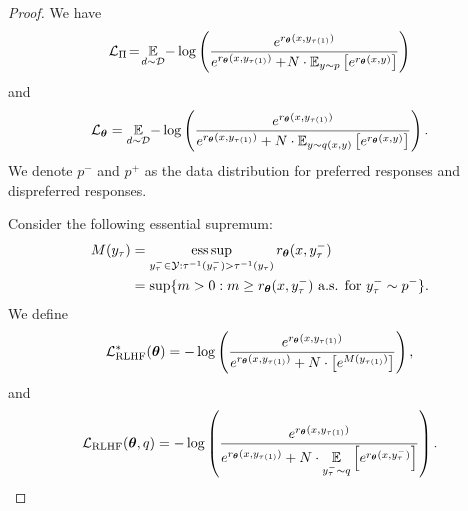 \begin{proof}
We have 
\[
\mathcal{L}_{\Pi} \!=\! \operatorname*{\mathbb{E}}_{d\sim\mathcal{D}}   \!
			-\log\left(\frac{e^{{ r_{{\boldsymbol{\theta}}}(x,y_{\tau\left( 1\right)})}}}{e^{{ r_{{\boldsymbol{\theta}}}(x,y_{\tau\left( 1\right)})}}+\! N\cdot\operatorname*{\mathbb{E}}\nolimits_{y \sim p}\left[e^{{r_{{\boldsymbol{\theta}}}(x,y)}}\right]}\right) \]
and
\[
\mathcal{L}_{{\boldsymbol{\theta}}}= \operatorname*{\mathbb{E}}_{d\sim\mathcal{D}}   \!
-\log\left(\frac{e^{{ r_{{\boldsymbol{\theta}}}(x,y_{\tau\left( 1\right)})}}}{e^{{ r_{{\boldsymbol{\theta}}}(x,y_{\tau\left( 1\right)})}}+ N\cdot\operatorname*{\mathbb{E}}\nolimits_{y \sim q(x,y)}\left[e^{{r_{{\boldsymbol{\theta}}}(x,y)}}\right]}\right).
\]
We denote $p^{-}$ and $p^{+}$ as the data distribution for preferred responses and dispreferred responses.

Consider the following essential supremum:
\begin{equation*}
\begin{aligned}
M(y_{\tau})&=\operatorname*{ess\,sup}\limits_{y^{-}_{\tau}\in\mathcal{Y}:\tau^{-1}(y^{-}_{\tau})>\tau^{-1}(y_{\tau})}{r_{{\boldsymbol{\theta}}}(x,y^{-}_{\tau})}\\
&=\sup\{m>0:m\geq r_{{\boldsymbol{\theta}}}(x,y^{-}_{\tau})\text{ a.s. for } y^{-}_{\tau} \sim p^{-}\}.
\end{aligned}
\end{equation*}
We define
\begin{equation*}
\mathcal{L}_{\text{RLHF}}^{*}({\boldsymbol{\theta}})=-\log\left(\frac{e^{{ r_{{\boldsymbol{\theta}}}(x,y_{\tau\left( 1\right)})}}}{e^{{ r_{{\boldsymbol{\theta}}}(x,y_{\tau\left( 1\right)})}}+N\cdot \left[e^{M(y_{\tau\left(1\right)})}\right]}\right),
\end{equation*}
and
\begin{equation*}
\mathcal{L}_{\text{RLHF}}({\boldsymbol{\theta}},q)=-\log\left(\frac{e^{{ r_{{\boldsymbol{\theta}}}(x,y_{\tau\left( 1\right)})}}}{e^{{ r_{{\boldsymbol{\theta}}}(x,y_{\tau\left( 1\right)})}}+N\cdot \operatorname*{\mathbb{E}}\limits_{y^{-}_{\tau}\sim q}\left[e^{{r_{{\boldsymbol{\theta}}}(x,y^{-}_{\tau})}}\right]}\right).
\end{equation*}


\end{proof}
